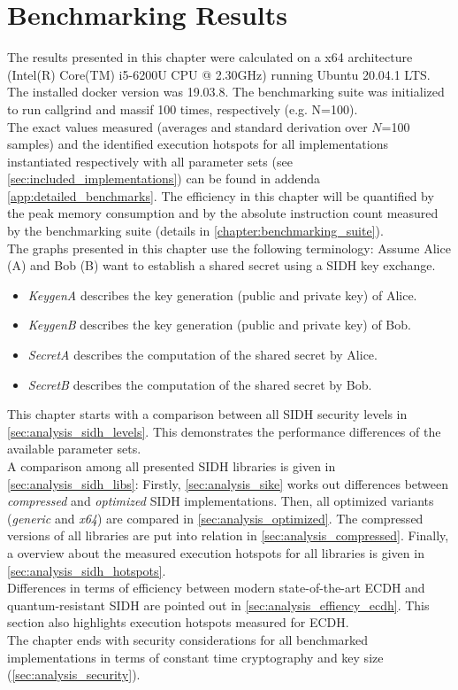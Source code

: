 \chapter{Benchmarking Results}\label{chapter:analysis}

The results presented in this chapter were calculated on a x64 architecture (Intel(R) Core(TM) i5-6200U CPU @ 2.30GHz) running Ubuntu 20.04.1 LTS. The installed docker version was 19.03.8. The benchmarking suite was initialized to run callgrind and massif 100 times, respectively (e.g. N=100).\\
The exact values measured (averages and standard derivation over $N$=100 samples) and the identified execution hotspots for all implementations instantiated respectively with all parameter sets (see \autoref{sec:included_implementations}) can be found in addenda \ref{app:detailed_benchmarks}. The efficiency in this chapter will be quantified by the peak memory consumption and by the absolute instruction count measured by the benchmarking suite (details in \autoref{chapter:benchmarking_suite}). \\
The graphs presented in this chapter use the following terminology:
Assume Alice (A) and Bob (B) want to establish a shared secret using a SIDH key exchange.
\begin{itemize}
\item \textit{KeygenA} describes the key generation (public and private key) of Alice.
\item \textit{KeygenB} describes the key generation (public and private key) of Bob.
\item \textit{SecretA} describes the computation of the shared secret by Alice.
\item \textit{SecretB} describes the computation of the shared secret by Bob.
\end{itemize}
This chapter starts with a comparison between all SIDH security levels in \autoref{sec:analysis_sidh_levels}. This demonstrates the performance differences of the available parameter sets. \\
A comparison among all presented SIDH libraries is given in \autoref{sec:analysis_sidh_libs}: Firstly, \ref{sec:analysis_sike} works out differences between \textit{compressed} and \textit{optimized} SIDH implementations. Then, all optimized variants (\textit{generic} and \textit{x64}) are compared in \ref{sec:analysis_optimized}. The compressed versions of all libraries are put into relation in \ref{sec:analysis_compressed}. Finally, a overview about the measured execution hotspots for all libraries is given in \ref{sec:analysis_sidh_hotspots}.\\
Differences in terms of efficiency between modern state-of-the-art ECDH and quantum-resistant SIDH are pointed out in \autoref{sec:analysis_effiency_ecdh}. This section also highlights execution hotspots measured for ECDH.\\
The chapter ends with security considerations for all benchmarked implementations in terms of constant time cryptography and key size (\autoref{sec:analysis_security}). 


